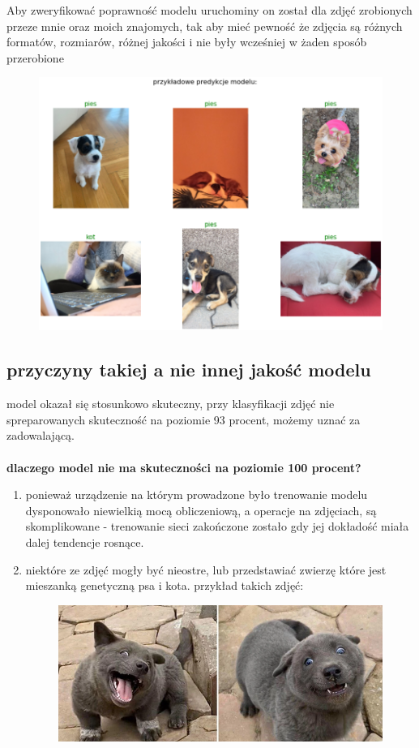 \documentclass[a4paper,12pt]{scrartcl}
\begin{document}
Aby zweryfikować poprawność modelu uruchominy on został dla zdjęć zrobionych przeze mnie oraz moich znajomych,
tak aby mieć pewność że zdjęcia są różnych formatów, rozmiarów, różnej jakości i nie 
były wcześniej w żaden sposób przerobione
\begin{figure}[h]
  \includegraphics[width=\linewidth]{preedictions.png}
\end{figure}
\newpage{}
\subsection{przyczyny takiej a nie innej jakość modelu}
model okazał się stosunkowo skuteczny, przy klasyfikacji 
zdjęć nie spreparowanych skuteczność na poziomie 93 
procent, możemy uznać za zadowalającą.\\\\
\textbf{dlaczego model nie ma skuteczności na poziomie 100 procent?}\\
\begin{enumerate}
  \item ponieważ urządzenie na którym prowadzone było trenowanie modelu dysponowało niewielkią mocą obliczeniową,
   a operacje na zdjęciach, są skomplikowane - trenowanie sieci zakończone zostało gdy jej dokładość miała dalej tendencje 
   rosnące.
  \item niektóre ze zdjęć mogły być nieostre, lub przedstawiać zwierzę które jest mieszanką genetyczną psa i kota.
  przykład takich zdjęć: 
  \begin{figure}[h]
    \includegraphics[width=\linewidth]{example.png}
  \end{figure}
\end{enumerate} 
\end{document}

